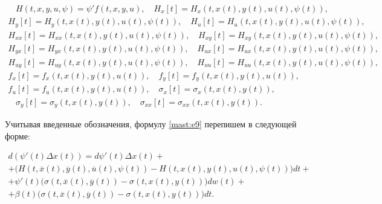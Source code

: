 \begin{gather*}

~~~~H(t,x,y,u,\psi)=\psi' f(t,x,y,u),  \quad H_{x}[t]=H_{x}(t,x(t),y(t),u(t),\psi (t)), \\

H_{y}[t]=H_{y}(t,x(t),y(t),u(t),\psi (t)), \quad H_{u}[t]=H_{u}(t,x(t),y(t),u(t),\psi (t)), \\

H_{xx}[t]=H_{xx}(t,x(t),y(t),u(t),\psi (t)), \quad H_{xy}[t]=H_{xy}(t,x(t),y(t),u(t),\psi (t)), \\

H_{yx}[t]=H_{yx}(t,x(t),y(t),u(t),\psi (t)), \quad H_{ux}[t]=H_{ux}(t,x(t),y(t),u(t),\psi (t)), \\

H_{uy}[t]=H_{uy}(t,x(t),y(t),u(t),\psi (t)), \quad H_{uu}[t]=H_{uu}(t,x(t),y(t),u(t),\psi (t)), \\

f_{x}[t]=f_{x}(t,x(t),y(t),u(t)), \quad f_{y}[t]=f_{y}(t,x(t),y(t),u(t)), \\

f_{u}[t]=f_{u}(t,x(t),y(t),u(t)), \quad \sigma_{x}[t]=\sigma_{x}(t,x(t),y(t)),~~~~ \\

~~~~\sigma_{y}[t]=\sigma_{y}(t,x(t),y(t)), \quad \sigma_{xx}[t]=\sigma_{xx}(t,x(t),y(t)).

\end{gather*}



Учитывая  введенные обозначения, формулу \eqref{mast:e9} перепишем в следующей форме: 

\begin{multline}

d \left( \psi'(t) \Delta x(t) \right)=d \psi'(t) \Delta x(t)

+

\\

+\bigl( H(t,\overline{x}(t),\overline{y}(t),\overline{u}(t),\psi (t))-H(t,x(t),y(t),u(t),\psi (t)) \bigr) dt+ \\

+ \psi'(t) \bigl( \sigma (t, \overline{x}(t), \overline{y}(t))-\sigma (t,x(t),y(t))\bigr) dw(t) + 

\\

+\beta (t)\bigl(  \sigma (t, \overline{x}(t), \overline{y}(t))-\sigma (t,x(t),y(t))  \bigr)  dt.    

\label{mast:e10}

\end{multline}



